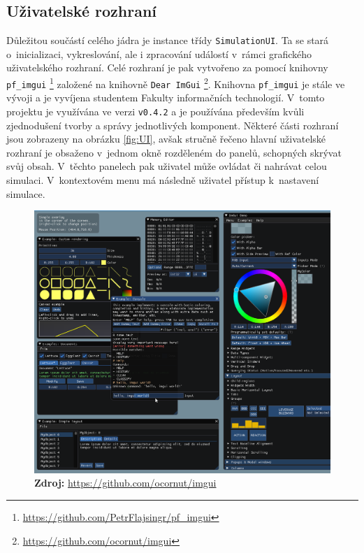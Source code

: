 \subsection{Uživatelské rozhraní}
\label{chapter:uzivRozh}

Důležitou součástí celého jádra je instance třídy \texttt{SimulationUI}. Ta se stará o~inicializaci, vykreslování, ale i zpracování událostí v~rámci grafického uživatelského rozhraní. Celé rozhraní je pak vytvořeno za pomocí knihovny \texttt{pf\_imgui} \footnote{\url{https://github.com/PetrFlajsingr/pf_imgui}} založené na knihovně \texttt{Dear ImGui} \footnote{\url{https://github.com/ocornut/imgui}}. Knihovna \texttt{pf\_imgui} je stále ve vývoji a je vyvíjena studentem Fakulty informačních technologií. V~tomto projektu je využívána ve verzi  \texttt{v0.4.2} a je používána především kvůli zjednodušení tvorby a správy jednotlivých komponent. Některé části rozhraní jsou zobrazeny na obrázku \ref{fig:UI}, avšak stručně řečeno hlavní uživatelské rozhraní je obsaženo v~jednom okně rozděleném do panelů, schopných skrývat svůj obsah. V~těchto panelech pak uživatel může ovládat či nahrávat celou simulaci. V~kontextovém menu má následně uživatel přístup k~nastavení simulace.


\begin{figure}[h!]
	\centering
	\captionsetup{justification=centering}
	\includegraphics[scale=0.1]{obrazky-figures/imgui.png}
	\textbf{Zdroj: } \url{https://github.com/ocornut/imgui}
	\label{fig:structsEvap}
\end{figure}

